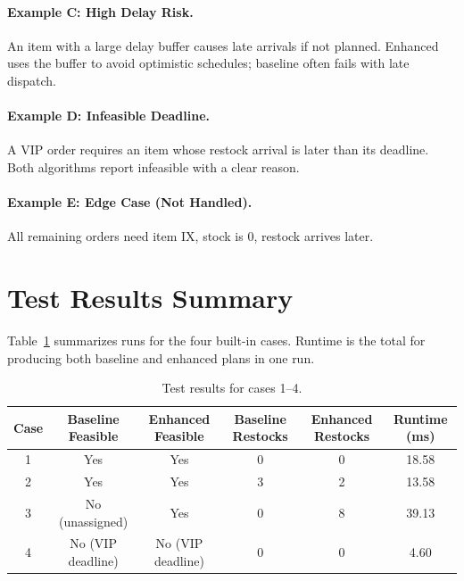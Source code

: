 \documentclass[11pt]{article}
\begin{document}
\paragraph{Example C: High Delay Risk.}
An item with a large delay buffer causes late arrivals if not planned. Enhanced uses the buffer to avoid optimistic schedules; baseline often fails with late dispatch.

\paragraph{Example D: Infeasible Deadline.}
A VIP order requires an item whose restock arrival is later than its deadline. Both algorithms report infeasible with a clear reason.

\paragraph{Example E: Edge Case (Not Handled).}
All remaining orders need item IX, stock is 0, restock arrives later.

\section{Test Results Summary}
Table~\ref{tab:test-results} summarizes runs for the four built-in cases. Runtime is the total for producing both baseline and enhanced plans in one run.

\begin{table}[h]
\centering
\begin{tabular}{|c|c|c|c|c|c|}
\hline
Case & Baseline Feasible & Enhanced Feasible & Baseline Restocks & Enhanced Restocks & Runtime (ms) \\
\hline
1 & Yes & Yes & 0 & 0 & 18.58 \\
2 & Yes & Yes & 3 & 2 & 13.58 \\
3 & No (unassigned) & Yes & 0 & 8 & 39.13 \\
4 & No (VIP deadline) & No (VIP deadline) & 0 & 0 & 4.60 \\
\hline
\end{tabular}
\caption{Test results for cases 1--4.}
\label{tab:test-results}
\end{table}
\end{document}

